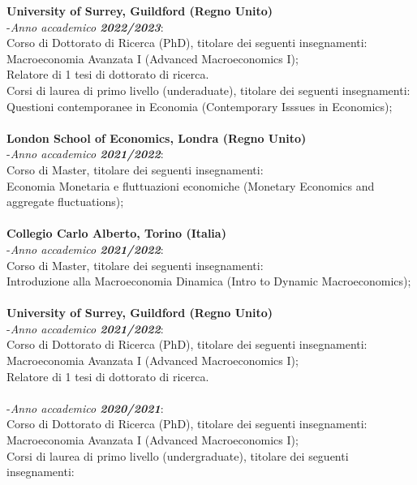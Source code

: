 \documentclass[10p]{article}
\begin{document}
{\bf University of Surrey, Guildford (Regno Unito)}\\
-\emph{Anno accademico \textbf{2022/2023}}: \\
Corso di Dottorato di Ricerca (PhD), titolare dei seguenti insegnamenti:\\
Macroeconomia Avanzata I (Advanced Macroeconomics I);\\
Relatore di 1 tesi di dottorato di ricerca.\\
Corsi di laurea di primo livello (underaduate), titolare dei seguenti insegnamenti: \\
Questioni contemporanee in Economia (Contemporary Isssues in Economics);\\
\\
{\bf London School of Economics, Londra (Regno Unito)}\\
-\emph{Anno accademico \textbf{2021/2022}}: \\
Corso di Master, titolare dei seguenti insegnamenti:\\
Economia Monetaria e fluttuazioni economiche (Monetary Economics and aggregate fluctuations);\\
\\
{\bf Collegio Carlo Alberto, Torino (Italia)}\\
-\emph{Anno accademico \textbf{2021/2022}}: \\
Corso di Master, titolare dei seguenti insegnamenti:\\
Introduzione alla Macroeconomia Dinamica (Intro to Dynamic Macroeconomics);\\
\\
{\bf University of Surrey, Guildford (Regno Unito)}\\
-\emph{Anno accademico \textbf{2021/2022}}: \\
Corso di Dottorato di Ricerca (PhD), titolare dei seguenti insegnamenti:\\
Macroeconomia Avanzata I (Advanced Macroeconomics I);\\
Relatore di 1 tesi di dottorato di ricerca.\\
\\
-\emph{Anno accademico \textbf{2020/2021}}: \\
Corso di Dottorato di Ricerca (PhD), titolare dei seguenti insegnamenti:\\
Macroeconomia Avanzata I (Advanced Macroeconomics I);\\
Corsi di laurea di primo livello (undergraduate), titolare dei seguenti insegnamenti: \\
\end{document}
